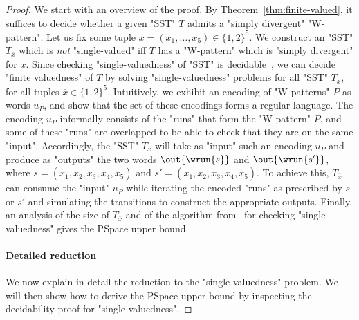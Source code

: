 \documentclass{theoretics}
\newcommand{\RestateGo}[1]{\renewcommand{#1}{(Restated)}}
\begin{document}
\RestateGo{\restateEffectiveness}
\Effectiveness*


\begin{proof}
    We start with an overview of the proof.
    By Theorem~\ref{thm:finite-valued}, it suffices to decide
    whether a given "SST" $T$ admits a "simply divergent"
    "W-pattern". Let us fix some tuple $\overline{x} =
    (x_1,\dots,x_5)\in\{1,2\}^5$. We construct an "SST"
    $T_{\overline{x}}$ which is \emph{not} "single-valued" iff $T$
    has a "W-pattern" which is "simply divergent" for $\overline{x}$. 
    Since checking "single-valuedness" of "SST" is 
    decidable~\cite{DBLP:conf/icalp/AlurD11}, 
    we can decide "finite valuedness" of $T$
    by solving "single-valuedness" problems
    for all "SST" $T_{\overline{x}}$, for all tuples
    $\overline{x}\in \{1,2\}^5$.
	Intuitively, we exhibit an encoding of
    "W-patterns" $P$ as words $u_P$,
    and show that the set of these encodings forms a regular language. 
    The encoding $u_P$ informally consists of the 
    "runs" that form the "W-pattern" $P$, and
    some of these "runs"
    are overlapped to be able to check that they are on the same "input". 
    Accordingly, the "SST" $T_{\overline{x}}$ will take as 
    "input" such an encoding $u_P$ and produce as "outputs" the 
    two words 
    $\out{\wrun{s}}$ and $\out{\wrun{s'}}$,
    where $s = (x_1,x_2,x_3,\underline{x_4},x_5)$ and 
    $s' = (x_1,\underline{x_2},x_3,x_4,x_5)$. 
	To achieve this, $T_{\overline{x}}$ can consume the "input" $u_P$
    while iterating the encoded "runs" as prescribed by $s$ or $s'$
    and simulating the transitions to construct the appropriate outputs.
    Finally, an analysis of the size of $T_{\overline{x}}$ and of the 
    algorithm from~\cite{DBLP:conf/icalp/AlurD11} 
    for checking "single-valuedness" gives the {\upshape\sc PSpace} upper bound.



    \paragraph{Detailed reduction} 
    We now explain in detail the reduction to
    the "single-valuedness" problem. We will 
    then show how to derive the {\upshape\sc PSpace} upper bound 
    by inspecting the decidability proof for "single-valuedness". 


\end{proof}
\end{document}
